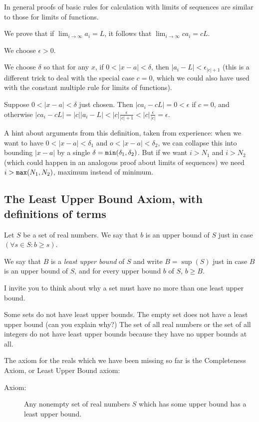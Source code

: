 \documentclass[12pt]{article}
\begin{document}
In general proofs of basic rules for calculation with limits of sequences are similar to those for limits of functions.

We prove that if $\lim_{i \rightarrow \infty}a_i=L$, it follows that $\lim_{i \rightarrow \infty}ca_i = cL$.

We choose $\epsilon>0$.

We choose $\delta$ so that for any $x$, if $0<|x-a|<\delta$, then  $|a_i-L|<\epsilon_{|c|+1}$ (this is a different trick to deal with the special case $c=0$, which we could also have used with the constant multiple rule for limits of functions).

Suppose $0<|x-a|<\delta$ just chosen.  Then $|ca_i -cL| = 0 <\epsilon$ if $c=0$, and otherwise $|ca_i - cL| = |c||a_i-L| < |c|\frac\epsilon{|c|+1} < |c|\frac\epsilon{|c|}=\epsilon$.

A hint about arguments from this definition, taken from experience:  when we want to have $0<|x-a|<\delta_1$ and $o<|x-a|<\delta_2$, we can collapse this into bounding $|x-a|$ by a single $\delta = {\tt min}(\delta_1,\delta_2)$.  But if we want $i>N_1$ and $i>N_2$ (which could happen in an analogous proof about limits of sequences) we need $i>{\tt max}(N_1,N_2)$, maximum instead of minimum.

\subsection{The Least Upper Bound Axiom, with definitions of terms}

Let $S$ be a set of real numbers.  We say that $b$ is an upper bound of $S$ just in case $(\forall s \in S:b \geq s)$.

We say that $B$ is a {\em least upper bound\/} of $S$ and write $B=\sup(S)$ just in case $B$ is an upper bound of $S$, and for every upper bound $b$ of $S$, $b \geq B$.

I invite you to think about why a set must have no more than one least upper bound. 

Some sets do not have least upper bounds.  The empty set does not have a least upper bound (can you explain why?)  The set of all real numbers or the set of all integers do not have least upper bounds because they have no upper bounds at all.

The axiom for the reals which we have been missing so far is the Completeness Axiom, or Least Upper Bound axiom:

\begin{description}

\item[Axiom:]  Any nonempty set of real numbers $S$ which has some upper bound has a least upper bound.

\end{description}
\end{document}

